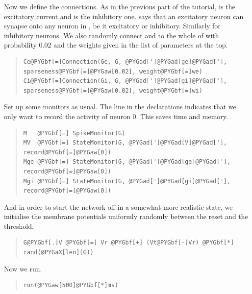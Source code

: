 \documentclass[letterpaper,10pt,english]{manual}
\begin{document}
Now we define the connections. As in the previous part of the
tutorial,  is the excitatory current and  is the inhibitory
one.  says that an excitatory neuron can synapse onto any
neuron in , be it excitatory or inhibitory. Similarly for
inhibitory neurons. We also randomly connect  and  to the whole of  with
probability 0.02 and the weights given in the list of
parameters at the top.
\begin{quote}

\begin{Verbatim}[commandchars=@\[\]]
Ce@PYGbf[=]Connection(Ge, G, @PYGad[']@PYGad[ge]@PYGad['], sparseness@PYGbf[=]@PYGaw[0.02], weight@PYGbf[=]we)
Ci@PYGbf[=]Connection(Gi, G, @PYGad[']@PYGad[gi]@PYGad['], sparseness@PYGbf[=]@PYGaw[0.02], weight@PYGbf[=]wi)
\end{Verbatim}
\end{quote}

Set up some monitors as usual. The line  in the \hyperlink{brian.StateMonitor}{}
declarations indicates that we only want to record the activity of
neuron 0. This saves time and memory.
\begin{quote}

\begin{Verbatim}[commandchars=@\[\]]
M   @PYGbf[=] SpikeMonitor(G)
MV  @PYGbf[=] StateMonitor(G, @PYGad[']@PYGad[V]@PYGad['], record@PYGbf[=]@PYGaw[0])
Mge @PYGbf[=] StateMonitor(G, @PYGad[']@PYGad[ge]@PYGad['], record@PYGbf[=]@PYGaw[0])
Mgi @PYGbf[=] StateMonitor(G, @PYGad[']@PYGad[gi]@PYGad['], record@PYGbf[=]@PYGaw[0])
\end{Verbatim}
\end{quote}

And in order to start the network off in a somewhat
more realistic state, we initialise the membrane
potentials uniformly randomly between the reset and
the threshold.
\begin{quote}

\begin{Verbatim}[commandchars=@\[\]]
G@PYGbf[.]V @PYGbf[=] Vr @PYGbf[+] (Vt@PYGbf[-]Vr) @PYGbf[*] rand(@PYGaX[len](G))
\end{Verbatim}
\end{quote}

Now we run.
\begin{quote}

\begin{Verbatim}[commandchars=@\[\]]
run(@PYGaw[500]@PYGbf[*]ms)
\end{Verbatim}
\end{quote}
\end{document}
